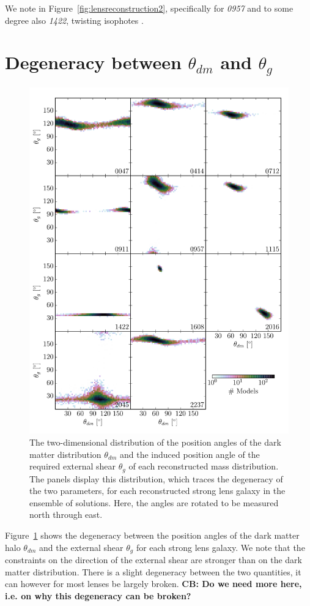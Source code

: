 \documentclass[useAMS,usenatbib]{mn2e}
\begin{document}
We note in Figure~\ref{fig:lensreconstruction2}, specifically for {\it0957} and to some degree also {\it1422}, twisting isophotes \citep[e.g.][]{1978ComAp...8...27B}.

\section{Degeneracy between $\theta_{dm}$ and $\theta_{g}$}\label{sec:shearshapedeg}
\begin{figure}
  \centering
  \includegraphics[width=.9\linewidth]{Figures/theta_scatter.pdf}
  \caption[width=\linewidth]{The two-dimensional distribution of the position angles of the dark matter distribution $\theta_{dm}$ and the induced position angle of the required external shear $\theta_{g}$ of each reconstructed mass distribution. The panels display this distribution, which traces the degeneracy of the two parameters, for each reconstructed strong lens galaxy in the ensemble of solutions. Here, the angles are rotated to be measured north through east.}
  \label{fig:thetascatter}
\end{figure}

Figure~\ref{fig:thetascatter} shows the degeneracy between the position angles of the dark matter halo $\theta_{dm}$ and the external shear $\theta_{g}$ for each strong lens galaxy. We note that the constraints on the direction of the external shear are stronger than on the dark matter distribution. There is a slight degeneracy between the two quantities, it can however for most lenses be largely broken. \textbf{CB: Do we need more here, i.e. on why this degeneracy can be broken?}
\end{document}
